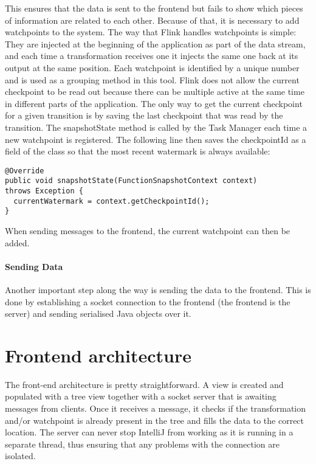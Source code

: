 This ensures that the data is sent to the frontend but fails to show which pieces of information are related to each other. Because of that, it is necessary to add watchpoints to the system. The way that Flink handles watchpoints is simple: They are injected at the beginning of the application as part of the data stream, and each time a transformation receives one it injects the same one back at its output at the same position. Each watchpoint is identified by a unique number and is used as a grouping method in this tool. Flink does not allow the current checkpoint to be read out because there can be multiple active at the same time in different parts of the application. The only way to get the current checkpoint for a given transition is by saving the last checkpoint that was read by the transition. The snapshotState method is called by the Task Manager each time a new watchpoint is registered. The following line then saves the checkpointId as a field of the class so that the most recent watermark is always available:

\begin{lstlisting}[caption={Save Watermark}]
@Override
public void snapshotState(FunctionSnapshotContext context)
throws Exception {
  currentWatermark = context.getCheckpointId();
}
\end{lstlisting}

When sending messages to the frontend, the current watchpoint can then be added.

\paragraph{Sending Data}

Another important step along the way is sending the data to the frontend. This is done by establishing a socket connection to the frontend (the frontend is the server) and sending serialised Java objects over it.

\section{Frontend architecture}
\label{fbFrontend}
The front-end architecture is pretty straightforward. A view is created and populated with a tree view together with a socket server that is awaiting messages from clients. Once it receives a message, it checks if the transformation and/or watchpoint is already present in the tree and fills the data to the correct location. The server can never stop IntelliJ from working as it is running in a separate thread, thus ensuring that any problems with the connection are isolated.


